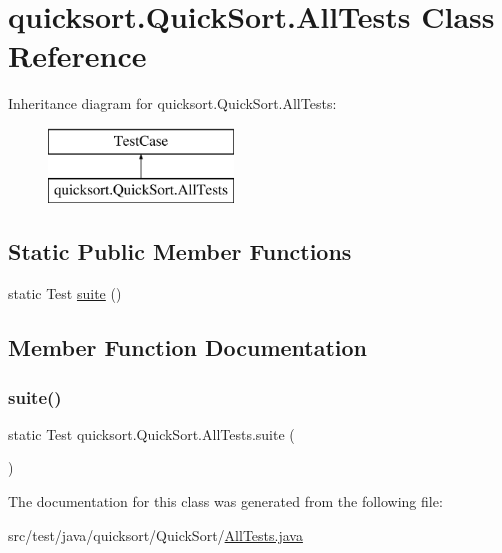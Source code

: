 \hypertarget{classquicksort_1_1_quick_sort_1_1_all_tests}{}\section{quicksort.\+Quick\+Sort.\+All\+Tests Class Reference}
\label{classquicksort_1_1_quick_sort_1_1_all_tests}
Inheritance diagram for quicksort.\+Quick\+Sort.\+All\+Tests\+:\begin{figure}[H]
\begin{center}
\leavevmode
\includegraphics[height=2.000000cm]{classquicksort_1_1_quick_sort_1_1_all_tests}
\end{center}
\end{figure}
\subsection*{Static Public Member Functions}
\begin{DoxyCompactItemize}
\item 
static Test \hyperlink{classquicksort_1_1_quick_sort_1_1_all_tests_aaac604464f6e9b647d2b6cd28c20b215}{suite} ()
\end{DoxyCompactItemize}


\subsection{Member Function Documentation}
\hypertarget{classquicksort_1_1_quick_sort_1_1_all_tests_aaac604464f6e9b647d2b6cd28c20b215}{}\label{classquicksort_1_1_quick_sort_1_1_all_tests_aaac604464f6e9b647d2b6cd28c20b215} 
\subsubsection{\texorpdfstring{suite()}{suite()}}
{\footnotesize\ttfamily static Test quicksort.\+Quick\+Sort.\+All\+Tests.\+suite (\begin{DoxyParamCaption}{ }\end{DoxyParamCaption})\hspace{0.3cm}{\ttfamily [static]}}



The documentation for this class was generated from the following file\+:\begin{DoxyCompactItemize}
\item 
src/test/java/quicksort/\+Quick\+Sort/\hyperlink{_all_tests_8java}{All\+Tests.\+java}\end{DoxyCompactItemize}
